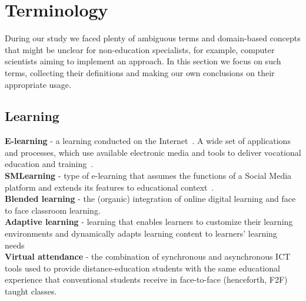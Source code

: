 \documentclass[ngerman,UKenglish,table]{scrbook}
\begin{document}
\section{Terminology}
\label{sec:Terminology}
During our study we faced plenty of ambiguous terms and domain-based concepts that might be unclear for non-education specialists, for example, computer scientists aiming to implement an approach.
In this section we focus on such terms, collecting their definitions and making our own conclusions on their appropriate usage.

\subsection{Learning}
\textbf{E-learning} - a learning conducted on the Internet~\cite{Dahlan2010}.
A wide set of applications and processes, which use available electronic media and tools
to deliver vocational education and training~\cite{de2009rss}.\\
\textbf{SMLearning} - type of e-learning that assumes the functions of a Social Media platform and extends its features to educational context~\cite{Claros2013}.\\
\textbf{Blended learning} - the (organic) integration of online digital learning and face to face classroom learning\cite{Cai2010}.\\
\textbf{Adaptive learning} - learning that enables learners to customize their learning environments and dynamically adapts learning content to learners' learning needs~\cite{brusilovsky2001adaptive}\\
\textbf{Virtual attendance} - the combination of synchronous and asynchronous ICT tools used to provide distance-education students with the same educational experience that conventional students receive in face-to-face (henceforth, F2F) taught classes.\\
\end{document}
